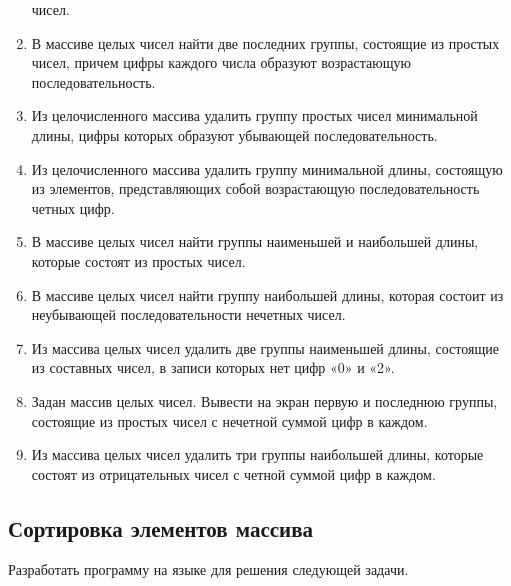 \begin{enumerate}
чисел.
\item В массиве целых чисел найти две последних группы, состоящие из простых чисел, причем цифры каждого числа образуют
возрастающую последовательность.
\item Из целочисленного массива удалить группу простых чисел минимальной длины, цифры которых образуют убывающей
последовательность.
\item Из целочисленного массива удалить группу минимальной длины, состоящую из элементов, представляющих собой
возрастающую последовательность четных цифр.
\item В массиве целых чисел найти группы наименьшей и наибольшей длины, которые состоят из простых чисел.
\item В массиве целых чисел найти группу наибольшей длины, которая состоит из неубывающей последовательности нечетных
чисел.
\item Из массива целых чисел удалить две группы наименьшей длины, состоящие из составных чисел, в записи которых нет
цифр «0» и «2».
\item Задан массив целых чисел. Вывести на экран первую и последнюю группы, состоящие из простых чисел с нечетной суммой
цифр в каждом.
\item Из массива целых чисел удалить три группы наибольшей длины, которые состоят из отрицательных чисел с четной суммой
цифр в каждом.
\end{enumerate}

\subsection[Сортировка элементов массива]{Сортировка элементов массива}
Разработать программу на языке  для решения следующей задачи.

